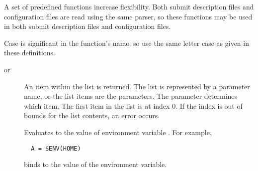 
A set of predefined functions increase flexibility.
Both submit description files and configuration files are read using
the same parser,
so these functions may be used in both submit description files and
configuration files.

Case is significant in the function's name, so use the
same letter case as given in these definitions.

\begin{description}

\item [ 
       or ]
An item within the list is returned.
The list is represented by a parameter name,
or the list items are the parameters.
The  parameter determines which item.
The first item in the list is at index 0.
If the index is out of bounds for the list contents, 
an error occurs.


\item []
Evaluates to the value of environment variable 
.
For example, 
\begin{verbatim}
  A = $ENV(HOME)
\end{verbatim}
binds  to the value of the  environment variable.


\end{description}
